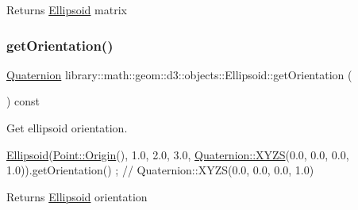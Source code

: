 \begin{DoxyReturn}{Returns}
\hyperlink{classlibrary_1_1math_1_1geom_1_1d3_1_1objects_1_1_ellipsoid}{Ellipsoid} matrix 
\end{DoxyReturn}
\mbox{\label{classlibrary_1_1math_1_1geom_1_1d3_1_1objects_1_1_ellipsoid_a8d426da587827eff577de4edb58ae417}} 
\subsubsection{\texorpdfstring{get\+Orientation()}{getOrientation()}}
{\footnotesize\ttfamily \hyperlink{classlibrary_1_1math_1_1geom_1_1d3_1_1trf_1_1rot_1_1_quaternion}{Quaternion} library\+::math\+::geom\+::d3\+::objects\+::\+Ellipsoid\+::get\+Orientation (\begin{DoxyParamCaption}{ }\end{DoxyParamCaption}) const}



Get ellipsoid orientation. 


\begin{DoxyCode}
\hyperlink{classlibrary_1_1math_1_1geom_1_1d3_1_1objects_1_1_ellipsoid_aae81fe0edc7f0e8d4590ea89ae73cb14}{Ellipsoid}(\hyperlink{classlibrary_1_1math_1_1geom_1_1d3_1_1objects_1_1_point_ab2a38e285c562e50bf350272c083986f}{Point::Origin}(), 1.0, 2.0, 3.0, \hyperlink{classlibrary_1_1math_1_1geom_1_1d3_1_1trf_1_1rot_1_1_quaternion_a006294eb483bcfc352c2dc36cf19ceec}{Quaternion::XYZS}(0.0, 0.0, 
      0.0, 1.0)).getOrientation() ; \textcolor{comment}{// Quaternion::XYZS(0.0, 0.0, 0.0, 1.0)}
\end{DoxyCode}


\begin{DoxyReturn}{Returns}
\hyperlink{classlibrary_1_1math_1_1geom_1_1d3_1_1objects_1_1_ellipsoid}{Ellipsoid} orientation 
\end{DoxyReturn}
\mbox{\label{classlibrary_1_1math_1_1geom_1_1d3_1_1objects_1_1_ellipsoid_a33dde96894c213da77ee116ff18fdf86}} 
